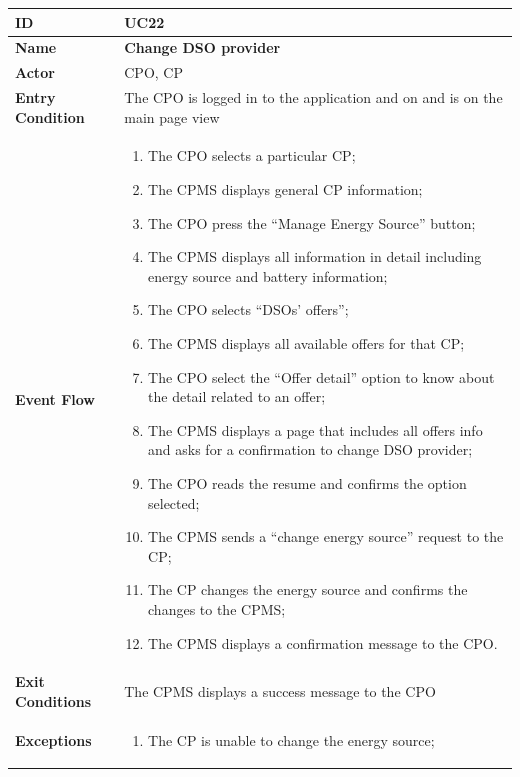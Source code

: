 \documentclass{Configuration_Files/PoliMi3i_thesis}
\begin{document}
\begin{table}[H]
    \begin{xltabular}{\textwidth}{| >{}l | X |}
    \hline
    \textbf{ID} & \textbf{UC22}\T\B\\
    \hline
    \textbf{Name} & \textbf{Change DSO provider}\T\B\\
    \hline \hline
    \textbf{Actor} & CPO, CP\T\B \\
    \hline
    \textbf{Entry Condition} & The CPO is logged in to the application and on and is on the main page view\T\B\\
    \hline
    \textbf{Event Flow} & 
        \begin{enumerate}
        \item The CPO selects a particular CP;
        \item The CPMS displays general CP information;
        \item The CPO press the “Manage Energy Source” button;
        \item The CPMS displays all information in detail including energy source and battery information;
        \item The CPO selects “DSOs’ offers”;
        \item The CPMS displays all available offers for that CP;
        \item The CPO select the “Offer detail” option to know about the detail related to an offer;
        \item The CPMS displays a page that includes all offers info and asks for a confirmation to change DSO provider;
        \item The CPO reads the resume and confirms the option selected;
        \item The CPMS sends a “change energy source” request to the CP;
        \item The CP changes the energy source and confirms the changes to the CPMS;
        \item The CPMS displays a confirmation message to the CPO.
        \end{enumerate}\B\\
    \hline
    \textbf{Exit Conditions} & The CPMS displays a success message to the CPO\B\\
    \hline
    \textbf{Exceptions} & \begin{enumerate}
        \item The CP is unable to change the energy source;

\end{enumerate}
\end{xltabular}
\end{table}
\end{document}
